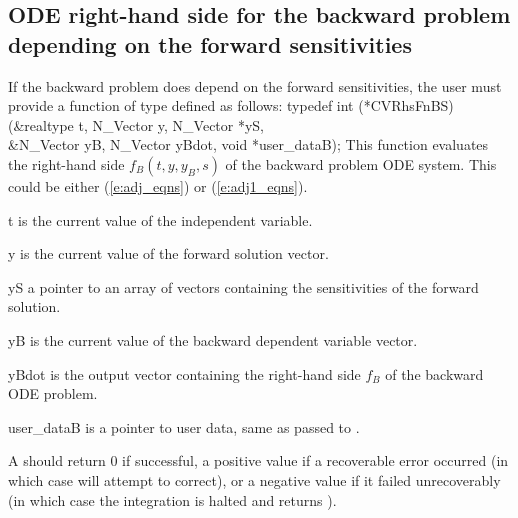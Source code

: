 \subsection{ODE right-hand side for the backward problem depending on the forward sensitivities}\label{ss:ODErhs_bs}

If the backward problem does depend on the forward sensitivities,
the user must provide a  function of type  defined as follows:
{
  typedef int (*CVRhsFnBS)(&realtype t, N\_Vector y, N\_Vector *yS, \\
                           &N\_Vector yB, N\_Vector yBdot, void *user\_dataB);
}
{
  This function evaluates the right-hand side $f_B(t, y, y_B, s)$ of the backward problem
  ODE system.  This could be either (\ref{e:adj_eqns}) or (\ref{e:adj1_eqns}).
}
{
  \begin{args}
  \item[t]
    is the current value of the independent variable.
  \item[y]
    is the current value of the forward solution vector.
  \item[yS]
    a pointer to an array of  vectors containing the sensitivities of
    the forward solution.
  \item[yB]
    is the current value of the backward dependent variable vector.
  \item[yBdot]
    is the output vector containing the right-hand side $f_B$ of the backward ODE problem.
  \item[user\_dataB]
    is a pointer to user data, same as passed to .
  \end{args}
}
{
  A  should return 0 if successful, a positive value if a recoverable
  error occurred (in which case {\cvodes} will attempt to correct), or a negative
  value if it failed unrecoverably (in which case the integration is halted and
   returns ).
}
